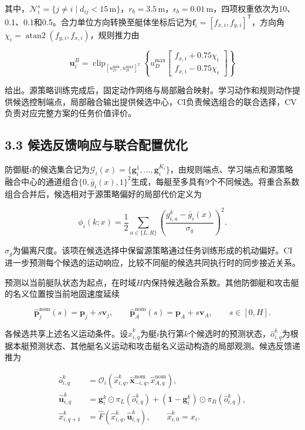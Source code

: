 \documentclass[UTF8,a4paper,zihao=5,fontset=none]{ctexart}
\begin{document}
其中，\(\mathcal N_i^s=\{j\ne i\mid d_{ij}<15\,\mathrm m\}\)，\(r_b=3.5\,\mathrm m\)，\(\epsilon_b=0.01\,\mathrm m\)，四项权重依次为10、0.1、0.1和0.5。合力单位方向转换至艇体坐标后记为\(\boldsymbol f_i=[f_{x,i},f_{y,i}]^{\mathsf T}\)，方向角\(\chi_i=\operatorname{atan2}(f_{y,i},f_{x,i})\)，规则推力由

\[
\boldsymbol u_i^B=
\operatorname{clip}_{[u_D^{\min},u_D^{\max}]^2}
\left\{u_D^{\max}
\begin{bmatrix} f_{x,i}+0.75\chi_i\\ f_{x,i}-0.75\chi_i\end{bmatrix}\right\}
\tag{11}
\]

给出。源策略训练完成后，固定动作网络与局部融合映射。学习动作和规则动作提供候选控制端点，局部融合输出提供候选中心，CI负责候选组合的联合选择，CV负责对应完整方案的任务价值评价。

\subsection*{3.3
候选反馈响应与联合配置优化}

防御艇\(i\)的候选集合记为\(\mathcal G_i(x)=\{\boldsymbol g_i^1,\ldots,\boldsymbol g_i^{K_i}\}\)，由规则端点、学习端点和源策略融合中心的通道组合\(\{0,\bar g_i(x),1\}^2\)生成，每艇至多具有9个不同候选。将重合系数组合合并后，候选相对于源策略偏好的局部代价定义为

\[
\phi_i(k;x)=\frac12\sum_{a\in\{L,R\}}
\left(\frac{g_{i,a}^{k}-\bar g_i(x)}{\sigma_g}\right)^2.
\tag{12}
\]

\(\sigma_g\)为偏离尺度。该项在候选选择中保留源策略通过任务训练形成的机动偏好。CI进一步预测每个候选的运动响应，比较不同艇的候选共同执行时的同步接近关系。

预测以当前艇队状态为起点，在时域\(H\)内保持候选融合系数。其他防御艇和攻击艇的名义位置按当前地固速度延续

\[
\widehat{\boldsymbol p}^{\mathrm{nom}}_j(s)
=\boldsymbol p_j+s\boldsymbol v_j,
\qquad
\widehat{\boldsymbol p}^{\mathrm{nom}}_A(s)
=\boldsymbol p_A+s\boldsymbol v_A,
\qquad s\in[0,H].
\tag{13}
\]

各候选共享上述名义运动条件。设\(\widehat x_{i,q}^{k}\)为艇\(i\)执行第\(k\)个候选时的预测状态，\(\widehat o_{i,q}^{k}\)为根据本艇预测状态、其他艇名义运动和攻击艇名义运动构造的局部观测。候选反馈递推为

\[
\begin{aligned}
\widehat o_{i,q}^{k}
&=\mathcal O_i\!\left(\widehat x_{i,q}^{k},
\widehat{\boldsymbol x}_{-i,q}^{\mathrm{nom}},\widehat x_{A,q}^{\mathrm{nom}}\right),\\
\widehat{\boldsymbol u}_{i,q}^{k}
&=\boldsymbol g_i^k\odot\pi_L(\widehat o_{i,q}^{k})
+(\boldsymbol1-\boldsymbol g_i^k)\odot\pi_B(\widehat o_{i,q}^{k}),\\
\widehat x_{i,q+1}^{k}
&=\widehat F\!\left(\widehat x_{i,q}^{k},\widehat{\boldsymbol u}_{i,q}^{k}\right),
\qquad \widehat x_{i,0}^{k}=x_i.
\end{aligned}
\tag{14}
\]
\end{document}
